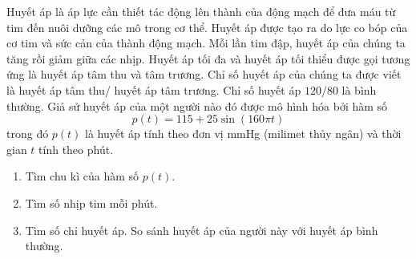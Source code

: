 \begin{bt}%
Huyết áp là áp lực cần thiết tác động lên thành của động mạch để đưa máu từ tim đến nuôi dưỡng các mô trong cơ thể. Huyết áp được tạo ra do lực co bóp của cơ tim và sức cản của thành động mạch. Mỗi lần tim đập, huyết áp của chúng ta tăng rồi giảm giữa các nhịp. Huyết áp tối đa và huyết áp tối thiểu được gọi tương ứng là huyết áp tâm thu và tâm trương. Chỉ số huyết áp của chúng ta được viết là huyết áp tâm thu/ huyết áp tâm trương. Chỉ số huyết áp $120/80$ là bình thường. Giả sử huyết áp của một người nào đó được mô hình hóa bởi hàm số
$$p(t)=115+25\sin(160\pi t)$$
trong đó $p(t)$ là huyết áp tính theo đơn vị mmHg (milimet thủy ngân) và thời gian $t$ tính theo phút.
\begin{enumerate}
	\item Tìm chu kì của hàm số $p(t)$.
	\item Tìm số nhịp tim mỗi phút.
	\item Tìm số chỉ huyết áp. So sánh huyết áp của người này với huyết áp bình thường.
\end{enumerate}
\end{bt}

